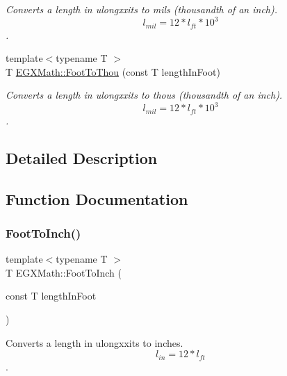 \begin{DoxyCompactItemize}
\begin{DoxyCompactList}\small\item\em Converts a length in ulongxxits to mils (thousandth of an inch). \[ l_{mil}=12 * l_{ft} * 10^{3} \]. \end{DoxyCompactList}\item 
{\footnotesize template$<$typename T $>$ }\\T \mbox{\hyperlink{group___e_g_x_math-_conversions-_length_conversions-_imperial-_foot-_imperial_gab8b02110f4657f92b7de8a42b9494017}{E\+G\+X\+Math\+::\+Foot\+To\+Thou}} (const T length\+In\+Foot)
\begin{DoxyCompactList}\small\item\em Converts a length in ulongxxits to thous (thousandth of an inch). \[ l_{mil}=12 * l_{ft} * 10^{3} \]. \end{DoxyCompactList}\end{DoxyCompactItemize}


\subsection{Detailed Description}


\subsection{Function Documentation}
\mbox{\label{group___e_g_x_math-_conversions-_length_conversions-_imperial-_foot-_imperial_ga2018d690827394d8a88e1a0d046f8e8d}} 
\subsubsection{\texorpdfstring{Foot\+To\+Inch()}{FootToInch()}}
{\footnotesize\ttfamily template$<$typename T $>$ \\
T E\+G\+X\+Math\+::\+Foot\+To\+Inch (\begin{DoxyParamCaption}\item[{const T}]{length\+In\+Foot }\end{DoxyParamCaption})}



Converts a length in ulongxxits to inches. \[ l_{in}=12 * l_{ft} \]. 

